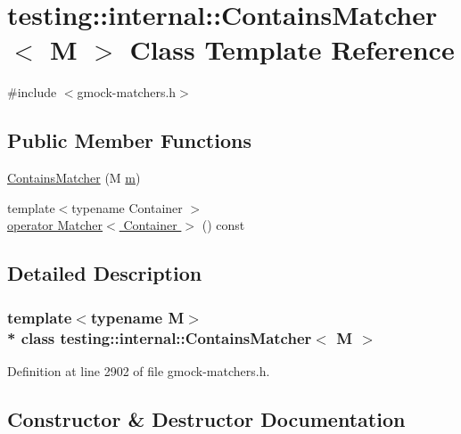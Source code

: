 \hypertarget{classtesting_1_1internal_1_1_contains_matcher}{}\section{testing\+:\+:internal\+:\+:Contains\+Matcher$<$ M $>$ Class Template Reference}
\label{classtesting_1_1internal_1_1_contains_matcher}


{\ttfamily \#include $<$gmock-\/matchers.\+h$>$}

\subsection*{Public Member Functions}
\begin{DoxyCompactItemize}
\item 
\hyperlink{classtesting_1_1internal_1_1_contains_matcher_a063d429bb4e59087ecdd51a037b8128a}{Contains\+Matcher} (M \hyperlink{variables__e_8js_aab4247b6acebcba996939b177f483c14}{m})
\item 
{\footnotesize template$<$typename Container $>$ }\\\hyperlink{classtesting_1_1internal_1_1_contains_matcher_a0a2b7d05dfc47e86e0a16d6915b9fac5}{operator Matcher$<$ Container $>$} () const 
\end{DoxyCompactItemize}


\subsection{Detailed Description}
\subsubsection*{template$<$typename M$>$\\*
class testing\+::internal\+::\+Contains\+Matcher$<$ M $>$}



Definition at line 2902 of file gmock-\/matchers.\+h.



\subsection{Constructor \& Destructor Documentation}
